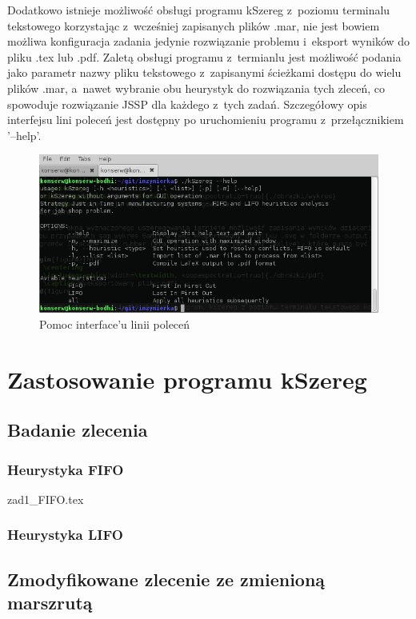 \documentclass[twoside]{kInzynierka}
\begin{document}
Dodatkowo istnieje możliwość obsługi programu kSzereg z~poziomu terminalu tekstowego korzystając z~wcześniej zapisanych plików .mar, nie jest bowiem możliwa konfiguracja zadania jedynie rozwiązanie problemu i~eksport wyników do pliku .tex lub .pdf. Zaletą obsługi programu z~termianlu jest możliwość podania jako parametr nazwy pliku tekstowego z~zapisanymi ścieżkami dostępu do wielu plików .mar, a~nawet wybranie obu heurystyk do rozwiązania tych zleceń, co spowoduje rozwiązanie JSSP dla każdego z~tych zadań. Szczegółowy opis interfejsu lini poleceń jest dostępny po uruchomieniu programu z~przełącznikiem '--help'.

\begin{figure}[htb]
    \centering
    \includegraphics[width=\textwidth, keepaspectratio=true]{./obrazki/cli}
    \caption{Pomoc interface'u linii poleceń}
\end{figure}

   
\section        {Zastosowanie programu kSzereg}
       
\subsection     {Badanie zlecenia}
\label{sec:z1}
\subsubsection  {Heurystyka FIFO}
\label{sec:z1f}
 {zad1_FIFO.tex}
\subsubsection  {Heurystyka LIFO}
\label{sec:z1l}


\newpage
\subsection     {Zmodyfikowane zlecenie ze zmienioną marszrutą}
\label{sec:z2}
\end{document}
